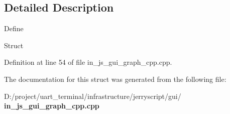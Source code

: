 \subsection{Detailed Description}
Define

Struct 

Definition at line 54 of file in\+\_\+js\+\_\+gui\+\_\+graph\+\_\+cpp.\+cpp.



The documentation for this struct was generated from the following file\+:\begin{DoxyCompactItemize}
\item 
D\+:/project/uart\+\_\+terminal/infrastructure/jerryscript/gui/\textbf{ in\+\_\+js\+\_\+gui\+\_\+graph\+\_\+cpp.\+cpp}\end{DoxyCompactItemize}
